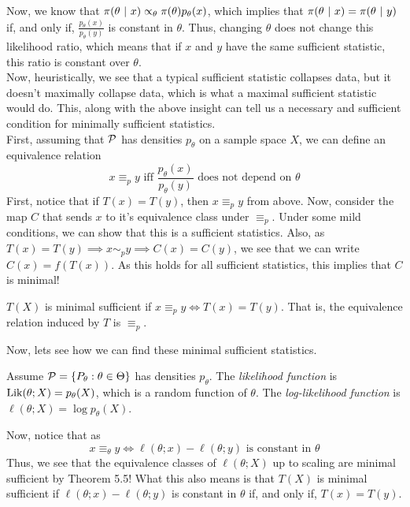 Now, we know that $\pi(\theta \given x) \propto_{\theta} \pi(\theta)p_{\theta}(x)$, which implies that $\pi(\theta \given x) = \pi(\theta \given y)$ if, and only if, $\frac{p_{\theta}(x)}{p_{\theta}(y)}$ is constant in $\theta$. Thus, changing $\theta$ does not change this likelihood ratio, which means that if $x$ and $y$ have the same sufficient statistic, this ratio is constant over $\theta$.\\

Now, heuristically, we see that a typical sufficient statistic collapses data, but it doesn't maximally collapse data, which is what a maximal sufficient statistic would do. This, along with the above insight can tell us a necessary and sufficient condition for minimally sufficient statistics.\\

First, assuming that $\cal{P}$ has densities $p_{\theta}$ on a sample space $X$, we can define an equivalence relation
\[ x \equiv_{p} y \text{ iff } \frac{p_{\theta}(x)}{p_{\theta}(y)} \text{ does not depend on } \theta \]
First, notice that if $T(x) = T(y)$, then $x \equiv_{p} y$ from above. Now, consider the map $C$ that sends $x$ to it's equivalence class under $\equiv_{p}$. Under some mild conditions, we can show that this is a sufficient statistics. Also, as $T(x) = T(y) \implies x \sim_{p} y \implies C(x) = C(y)$, we see that we can write $C(x) = f(T(x))$. As this holds for all sufficient statistics, this implies that $C$ is minimal!

\begin{theorem}
    $T(X)$ is minimal sufficient if $x \equiv_{p} y \iff T(x) = T(y)$. That is, the equivalence relation induced by $T$ is $\equiv_{p}$. 
\end{theorem}

Now, lets see how we can find these minimal sufficient statistics.

\begin{definition}
    Assume $\cal{P} = \{P_\theta : \theta \in \Theta\}$ has densities $p_{\theta}$. The \emph{likelihood function} is $\tt{Lik}(\theta; X) = p_{\theta}(X)$, which is a random function of $\theta$. The \emph{log-likelihood function} is $\ell(\theta; X) = \log p_{\theta}(X)$. 
\end{definition}

Now, notice that as
\[ x \equiv_{\theta} y \iff \ell(\theta; x) - \ell(\theta; y) \text{ is constant in } \theta \]
Thus, we see that the equivalence classes of $\ell(\theta; X)$ up to scaling are minimal sufficient by Theorem 5.5! What this also means is that $T(X)$ is minimal sufficient if $\ell(\theta;x) - \ell(\theta;y)$ is constant in $\theta$ if, and only if, $T(x) = T(y)$.
